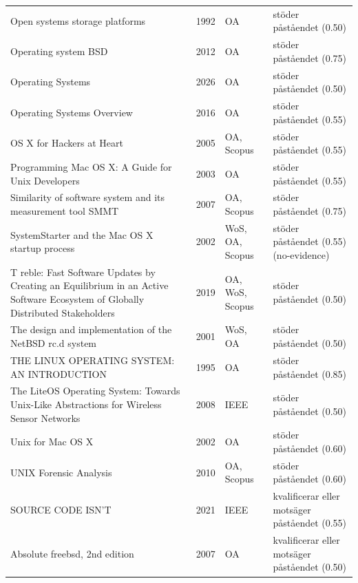 \begin{longtable}{@{}%
  >{\raggedright\arraybackslash}p{}c%
  >{\raggedright\arraybackslash}p{}%
  >{\raggedright\arraybackslash}p{}@{}}
Open systems storage platforms & 1992 & OA & stöder påståendet (0.50) \\
Operating system BSD & 2012 & OA & stöder påståendet (0.75) \\
Operating Systems & 2026 & OA & stöder påståendet (0.50) \\
Operating Systems Overview & 2016 & OA & stöder påståendet (0.55) \\
OS X for Hackers at Heart & 2005 & OA, Scopus & stöder påståendet (0.55) \\
Programming Mac OS X: A Guide for Unix Developers & 2003 & OA & stöder påståendet (0.55) \\
Similarity of software system and its measurement tool SMMT & 2007 & OA, Scopus & stöder påståendet (0.75) \\
SystemStarter and the Mac OS X startup process & 2002 & WoS, OA, Scopus & stöder påståendet (0.55) (no-evidence) \\
T reble: Fast Software Updates by Creating an Equilibrium in an Active Software Ecosystem of Globally Distributed Stakeholders & 2019 & OA, WoS, Scopus & stöder påståendet (0.50) \\
The design and implementation of the NetBSD rc.d system & 2001 & WoS, OA & stöder påståendet (0.50) \\
THE LINUX OPERATING SYSTEM: AN INTRODUCTION & 1995 & OA & stöder påståendet (0.85) \\
The LiteOS Operating System: Towards Unix-Like Abstractions for Wireless Sensor Networks & 2008 & IEEE & stöder påståendet (0.50) \\
Unix for Mac OS X & 2002 & OA & stöder påståendet (0.60) \\
UNIX Forensic Analysis & 2010 & OA, Scopus & stöder påståendet (0.60) \\
13 SOURCE CODE ISN'T & 2021 & IEEE & kvalificerar eller motsäger påståendet (0.55) \\
Absolute freebsd, 2nd edition & 2007 & OA & kvalificerar eller motsäger påståendet (0.50) \\
\end{longtable}
\endgroup
